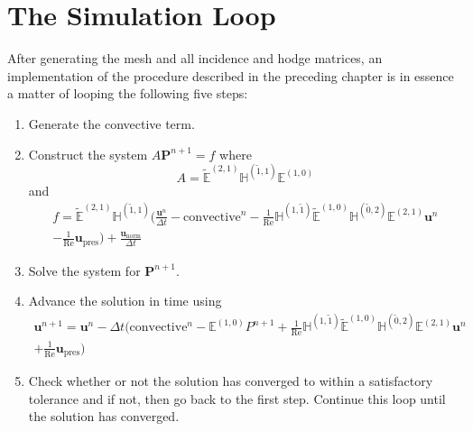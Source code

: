\section{The Simulation Loop}

After generating the mesh and all incidence and hodge matrices, an implementation of the procedure described in the preceding chapter is in essence a matter of looping the following five steps:
\begin{enumerate}
    \item Generate the convective term.
    \item Construct the system $A \mathbf{P}^{n+1} = f$ where
\begin{equation}
    \label{eq:time9}
    A = \tilde{\mathbb{E}}^{(2,1)} \mathbb{H}^{(\tilde{1},1)} \mathbb{E}^{(1,0)}
\end{equation}
    and
\begin{multline}
    f = \tilde{\mathbb{E}}^{(2,1)} \mathbb{H}^{(\tilde{1},1)} \biggl( \frac{\mathbf{u}^{n}}{\Delta t} - \text{convective}^{n} - \frac{1}{\text{Re}} \mathbb{H}^{(1,\tilde{1})} \tilde{\mathbb{E}}^{(1,0)} \mathbb{H}^{(\tilde{0},2)} \mathbb{E}^{(2,1)} \mathbf{u}^{n} \\
    - \frac{1}{\text{Re}} \mathbf{u}_{\text{pres}} \biggr) + \frac{\mathbf{u}^{}_{\text{norm}}}{\Delta t}
\end{multline}
    \item Solve the system for $\mathbf{P}^{n+1}$.
    \item Advance the solution in time using
\begin{multline}
    \mathbf{u}^{n+1} = \mathbf{u}^{n} - \Delta t \biggl( \text{convective}^{n} - \mathbb{E}^{(1,0)} P^{n+1} + \frac{1}{\text{Re}} \mathbb{H}^{(1,\tilde{1})} \tilde{\mathbb{E}}^{(1,0)} \mathbb{H}^{(\tilde{0},2)} \mathbb{E}^{(2,1)} \mathbf{u}^{n} \\
    + \frac{1}{\text{Re}} \mathbf{u}_{\text{pres}} \biggr)
\end{multline}
    \item Check whether or not the solution has converged to within a satisfactory tolerance and if not, then go back to the first step. Continue this loop until the solution has converged.
\end{enumerate}
